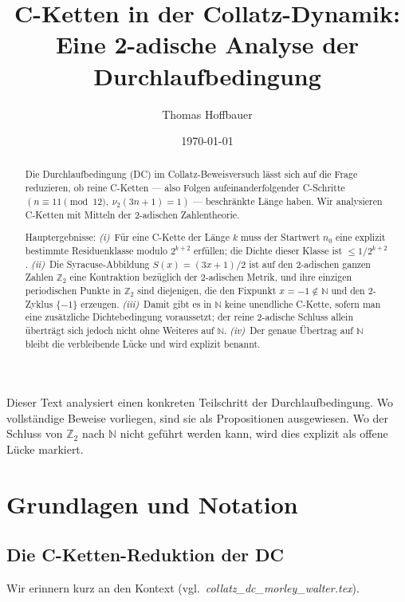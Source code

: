 \documentclass[12pt,a4paper]{article}
\title{%
  C-Ketten in der Collatz-Dynamik:\\[0.3em]
  \large Eine 2-adische Analyse der Durchlaufbedingung%
}
\author{Thomas Hoffbauer}
\date{\today}
\newcommand{\vii}{\nu_2}
\newcommand{\N}{\mathbb{N}}
\newcommand{\Ztwo}{\mathbb{Z}_2}     %
\begin{document}
\maketitle

\begin{abstract}
Die Durchlaufbedingung (DC) im Collatz-Beweisversuch lässt sich auf die
Frage reduzieren, ob reine C-Ketten --- also Folgen aufeinanderfolgender
C-Schritte $(n \equiv 11 \pmod{12},\ \vii(3n+1)=1)$ --- beschränkte Länge
haben. Wir analysieren C-Ketten mit Mitteln der 2-adischen Zahlentheorie.

Hauptergebnisse: \emph{(i)}~Für eine C-Kette der Länge $k$ muss der
Startwert $n_0$ eine explizit bestimmte Residuenklasse modulo $2^{k+2}$
erfüllen; die Dichte dieser Klasse ist $\leq 1/2^{k+2}$.
\emph{(ii)}~Die Syracuse-Abbildung $S(x) = (3x+1)/2$ ist auf den
2-adischen ganzen Zahlen $\Ztwo$ eine Kontraktion bezüglich der 2-adischen
Metrik, und ihre einzigen periodischen Punkte in $\Ztwo$ sind diejenigen, die
den Fixpunkt $x = -1 \notin \N$ und den 2-Zyklus $\{-1\}$ erzeugen.
\emph{(iii)}~Damit gibt es in $\N$ keine unendliche C-Kette, sofern man
eine zusätzliche Dichtebedingung voraussetzt; der reine 2-adische Schluss
allein überträgt sich jedoch nicht ohne Weiteres auf $\N$.
\emph{(iv)}~Der genaue Übertrag auf $\N$ bleibt die verbleibende Lücke
und wird explizit benannt.
\end{abstract}

\tableofcontents

\bigskip
\begin{tcolorbox}[warnung, title={Zur Einordnung}]
Dieser Text analysiert einen konkreten Teilschritt der Durchlaufbedingung.
Wo vollständige Beweise vorliegen, sind sie als Propositionen ausgewiesen.
Wo der Schluss von $\Ztwo$ nach $\N$ nicht geführt werden kann, wird dies
explizit als offene Lücke markiert.
\end{tcolorbox}

\section{Grundlagen und Notation}

\subsection{Die C-Ketten-Reduktion der DC}

Wir erinnern kurz an den Kontext (vgl.\ \textit{collatz\_dc\_morley\_walter.tex}).
\end{document}
